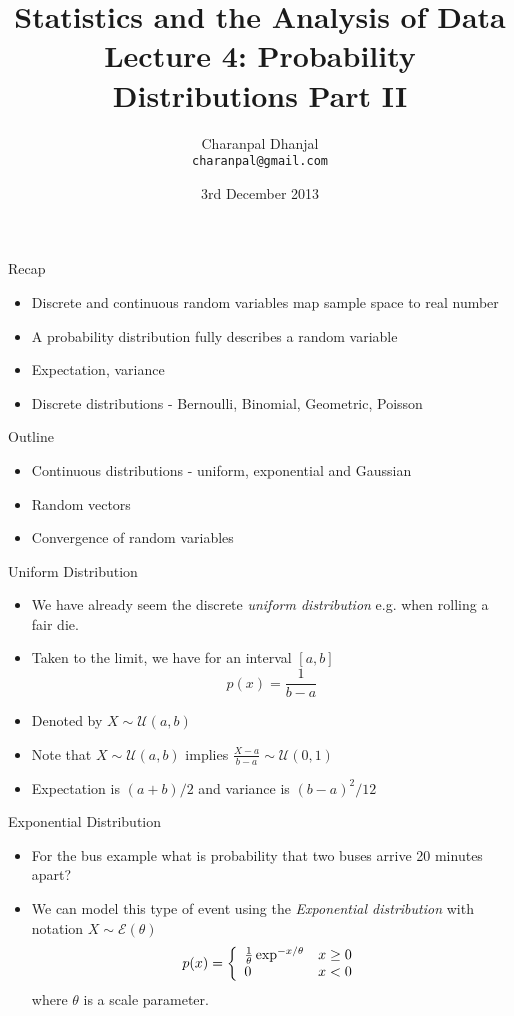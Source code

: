 \documentclass{beamer}
\title{Statistics and the Analysis of Data\\ Lecture 4: Probability Distributions Part II}
\author{Charanpal Dhanjal \\ \texttt{charanpal@gmail.com}}
\institute{\'{E}cole des Ponts}
\date{3rd December 2013}
\begin{document}
\frame{\titlepage}


\begin{frame}{Recap}  
\begin{itemize} 
\item Discrete and continuous random variables map sample space to real number 
\item A probability distribution fully describes a random variable 
\item Expectation, variance 
\item Discrete distributions - Bernoulli, Binomial, Geometric, Poisson
\end{itemize}
\end{frame}

\begin{frame}{Outline} 
\begin{itemize} 
 \item Continuous distributions - uniform, exponential and Gaussian
 \item Random vectors 
 \item Convergence of random variables
\end{itemize}
\end{frame}

\begin{frame}{Uniform Distribution}  
 \begin{itemize} 
\item We have already seem the discrete \emph{uniform distribution} e.g. when rolling a fair die. 
\item Taken to the limit, we have for an interval $[a, b]$ 
\begin{displaymath} 
 p(x) = \frac{1}{b-a}
\end{displaymath}
\item Denoted by $X \sim \mathcal{U}(a, b)$
\item Note that  $X \sim \mathcal{U}(a, b)$ implies $\frac{X - a}{b - a} \sim \mathcal{U}(0, 1)$
\item Expectation is $(a+b)/2$ and variance is $(b-a)^2/12$ 
\end{itemize}
\end{frame}

\begin{frame}{Exponential Distribution} 
\begin{itemize} 
 \item For the bus example what is probability that two buses arrive 20 minutes apart? 
 \item We can model this type of event using the \emph{Exponential distribution} with notation $X \sim \mathcal{E}(\theta)$
 \begin{displaymath}
  p(x) = \left\{ \begin{array}{l l}\frac{1}{\theta}  \exp^{-x/\theta} & x \geq 0 \\ 0 & x < 0 \end{array} \right. 
 \end{displaymath}
  where $\theta$ is a scale parameter. 
\end{itemize}
\end{frame}
\end{document}
